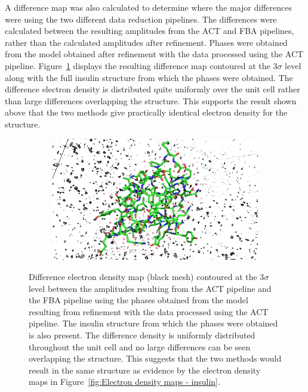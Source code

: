 A difference map was also calculated to determine where the major differences were using the two different data reduction pipelines.
The differences were calculated between the resulting amplitudes from the ACT and FBA pipelines, rather than the calculated amplitudes after refinement.
Phases were obtained from the model obtained after refinement with the data processed using the ACT pipeline.
Figure~\ref{fig:Difference electron density map - insulin} displays the resulting difference map contoured at the 3$\sigma$ level along with the full insulin structure from which the phases were obtained.
The difference electron density is distributed quite uniformly over the unit cell rather than large differences overlapping the structure.
This supports the result shown above that the two methods give practically identical electron density for the structure.
\begin{figure}
    \begin{subfigure}[b]{1.0\textwidth}
        \centering
        \includegraphics[width=\textwidth]{figures/datared/diff_aim_fba_insulin_seq_cnvc.png}
    \end{subfigure}
    \caption{Difference electron density map (black mesh) contoured at the 3$\sigma$ level between the amplitudes resulting from the ACT pipeline and the FBA pipeline using the phases obtained from the model resulting from refinement with the data processed using the ACT pipeline.
    The insulin structure from which the phases were obtained is also present.
    The difference density is uniformly distributed throughout the unit cell and no large differences can be seen overlapping the structure.
    This suggests that the two methods would result in the same structure as evidence by the electron density maps in Figure~\ref{fig:Electron density maps - insulin}.}
    \label{fig:Difference electron density map - insulin}
\end{figure}

